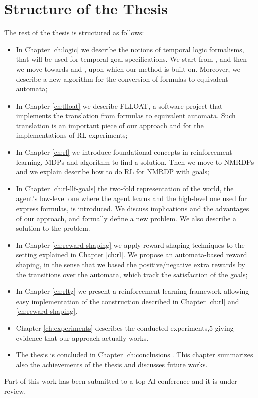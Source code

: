 \section{Structure of the Thesis}\label{sect:intro-structure-thesis}
The rest of the thesis is structured as follows:
\begin{itemize}
	\item In Chapter \ref{ch:logic} we describe the notions of temporal logic formalisms, that will be used for temporal goal specifications. We start from \LTL, \REGEX and then we move towards \LTLf and \LDLf, upon which our method is built on. Moreover, we describe a new algorithm for the conversion of \LLf formulas to equivalent automata;
	\item In Chapter \ref{ch:flloat} we describe FLLOAT, a software project that implements the translation from \LLf formulas to equivalent automata. Such translation is an important piece of our approach and for the implementations of RL experiments;
	\item In Chapter \ref{ch:rl} we introduce foundational concepts in reinforcement learning, MDPs and algorithm to find a solution. Then we move to NMRDPs and we explain describe how to do RL for NMRDP with \LLf goals;
	\item In Chapter \ref{ch:rl-llf-goals} the two-fold representation of the world, the agent's low-level one where the agent learns and the high-level one used for express \LLf formulas, is introduced. We discuss implications and the advantages of our approach, and formally define a new problem. We also describe a solution to the problem.
	\item In Chapter \ref{ch:reward-shaping} we apply reward shaping techniques to the setting explained in Chapter \ref{ch:rl}. We propose an automata-based reward shaping, in the sense that we based the positive/negative extra rewards by the transitions over the automata, which track the satisfaction of the \LLf goals;
	\item In Chapter \ref{ch:rltg} we present a reinforcement learning framework allowing easy implementation of the construction described in Chapter \ref{ch:rl} and \ref{ch:reward-shaping}.
	\item Chapter \ref{ch:experiments} describes the conducted experiments,5 giving evidence that our approach actually works.
	\item The thesis is concluded in Chapter \ref{ch:conclusions}. This chapter summarizes also the achievements of the thesis and discusses future works.
\end{itemize}
Part of this work has been submitted to a top AI conference and it is under review.